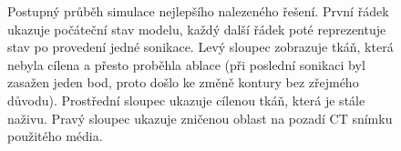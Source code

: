 \begin{figure}[H]
    \caption{Postupný průběh simulace nejlepšího nalezeného řešení. První řádek ukazuje počáteční stav modelu, každý další řádek poté reprezentuje stav po provedení jedné sonikace. Levý sloupec zobrazuje tkáň, která nebyla cílena a přesto proběhla ablace (při poslední sonikaci byl zasažen jeden bod, proto došlo ke změně kontury bez zřejmého důvodu). Prostřední sloupec ukazuje cílenou tkáň, která je stále naživu. Pravý sloupec ukazuje zničenou oblast na pozadí CT snímku použitého média.}
    \label{fg:hifu:prog}
\end{figure}


